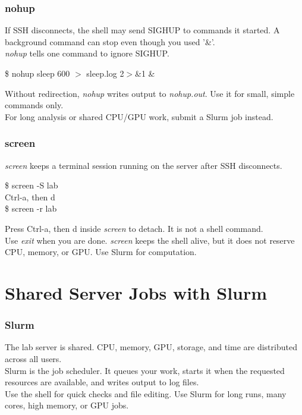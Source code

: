 \documentclass{beamer}
\begin{document}
	\begin{frame}
		\frametitle{nohup}
		If SSH disconnects, the shell may send SIGHUP to commands it started. A background command can stop even though you used '\&'. \\
		\textit{nohup} tells one command to ignore SIGHUP.

		\begin{example}
			\$ nohup sleep 600 $>$ sleep.log 2$>$\&1 \&
		\end{example}

		Without redirection, \textit{nohup} writes output to \textit{nohup.out}. Use it for small, simple commands only. \\
		For long analysis or shared CPU/GPU work, submit a Slurm job instead.
	\end{frame}

	\begin{frame}
		\frametitle{screen}
		\textit{screen} keeps a terminal session running on the server after SSH disconnects.
		\begin{example}
			\$ screen -S lab \\
			Ctrl-a, then d \\
			\$ screen -r lab
		\end{example}
		Press Ctrl-a, then d inside \textit{screen} to detach. It is not a shell command. \\
		Use \textit{exit} when you are done. \textit{screen} keeps the shell alive, but it does not reserve CPU, memory, or GPU. Use Slurm for computation.
	\end{frame}

	\section{Shared Server Jobs with Slurm}

	\begin{frame}
		\frametitle{Slurm}

		The lab server is shared. CPU, memory, GPU, storage, and time are distributed across all users. \\
		Slurm is the job scheduler. It queues your work, starts it when the requested resources are available, and writes output to log files. \\
		Use the shell for quick checks and file editing. Use Slurm for long runs, many cores, high memory, or GPU jobs.
	\end{frame}
\end{document}
